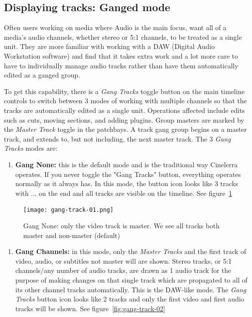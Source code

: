 \subsection{Displaying tracks: Ganged mode}%
\label{sub:displaying_tracks_ganged}

Often users working on media where Audio is the main focus, want all of a media's audio channels, whether stereo or 5:1 channels, to be treated as a single unit. They are more familiar with working with a DAW (Digital Audio Workstation software) and find that it takes extra work and a lot more care to have to individually manage audio tracks rather than have them automatically edited as a ganged group.

To get this capability, there is a \textit{Gang Tracks} toggle button on the main timeline controls to switch between 3 modes of working with multiple channels so that the tracks are automatically edited as a single unit. Operations affected include edits such as cuts, moving sections, and adding plugins. Group masters are marked by the \textit{Master Track} toggle in the patchbays. A track gang group begins on a master track, and extends to, but not including, the next master track. The 3 \textit{Gang Tracks} modes are:

\begin{enumerate}
	\item \textbf{Gang None:} this is the default mode and is the traditional way Cinelerra operates. If you never toggle the "Gang Tracks" button, everything operates normally as it always has. In this mode, the button icon looks like 3 tracks with $\dots$ on the end and all tracks are visible on the timeline. See figure~\ref{fig:gang-track-01}
\end{enumerate}

\begin{figure}[htpb]
	\centering
	\texttt{[image: gang-track-01.png]}
	\caption{Gang None: only the video track is master. We see all tracks both master and non-master (default)}
	\label{fig:gang-track-01}
\end{figure}

\begin{enumerate}[start=2]
	\item \textbf{Gang Channels:} in this mode, only the \textit{Master Tracks} and the first track of video, audio, or subtitles not master will are shown. Stereo tracks, or 5:1 channels/any number of audio tracks, are drawn as 1 audio track for the purpose of making changes on that single track which are propagated to all of its other channel tracks automatically. This is the DAW-like mode. The \textit{Gang Tracks} button icon looks like 2 tracks and only the first video and first audio tracks will be shown. See figure~\ref{fig:gang-track-02}
\end{enumerate}

